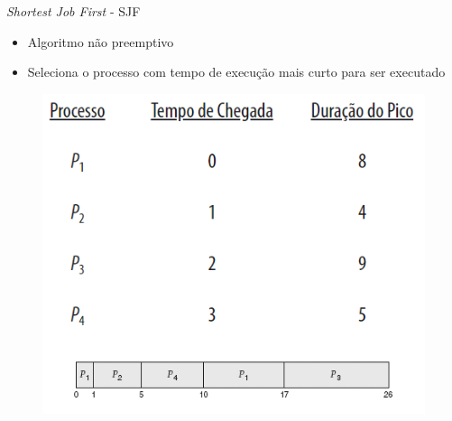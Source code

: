 \documentclass[aspectratio=169,
				xcolor=table]{beamer}
\begin{document}
	\begin{frame}{\textit{Shortest Job First} - SJF}
		\begin{itemize}
			\item Algoritmo não preemptivo 
			\vspace{1em}
			\item Seleciona o processo com tempo de execução mais curto para ser executado
						
		\end{itemize}
		\begin{figure}[hbtp]
		\centering
		\includegraphics[keepaspectratio, height=.6\textheight]{../figs/cap06/sjf.png}
		\end{figure}			
	\end{frame}
\end{document}

